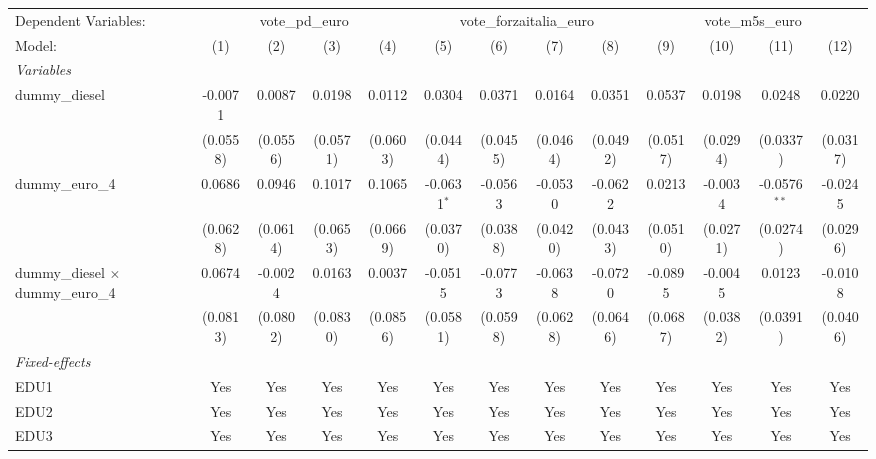 
\begingroup
\centering
\begin{tabular}{lcccccccccccc}
   \tabularnewline \midrule \midrule
   Dependent Variables: & \multicolumn{4}{c}{vote\_pd\_euro} & \multicolumn{4}{c}{vote\_forzaitalia\_euro} & \multicolumn{4}{c}{vote\_m5s\_euro}\\
   Model:                                    & (1)      & (2)      & (3)      & (4)      & (5)           & (6)      & (7)      & (8)      & (9)      & (10)     & (11)           & (12)\\  
   \midrule
   \emph{Variables}\\
   dummy\_diesel                             & -0.0071  & 0.0087   & 0.0198   & 0.0112   & 0.0304        & 0.0371   & 0.0164   & 0.0351   & 0.0537   & 0.0198   & 0.0248         & 0.0220\\   
                                             & (0.0558) & (0.0556) & (0.0571) & (0.0603) & (0.0444)      & (0.0455) & (0.0464) & (0.0492) & (0.0517) & (0.0294) & (0.0337)       & (0.0317)\\   
   dummy\_euro\_4                            & 0.0686   & 0.0946   & 0.1017   & 0.1065   & -0.0631$^{*}$ & -0.0563  & -0.0530  & -0.0622  & 0.0213   & -0.0034  & -0.0576$^{**}$ & -0.0245\\   
                                             & (0.0628) & (0.0614) & (0.0653) & (0.0669) & (0.0370)      & (0.0388) & (0.0420) & (0.0433) & (0.0510) & (0.0271) & (0.0274)       & (0.0296)\\   
   dummy\_diesel $\times$ dummy\_euro\_4     & 0.0674   & -0.0024  & 0.0163   & 0.0037   & -0.0515       & -0.0773  & -0.0638  & -0.0720  & -0.0895  & -0.0045  & 0.0123         & -0.0108\\   
                                             & (0.0813) & (0.0802) & (0.0830) & (0.0856) & (0.0581)      & (0.0598) & (0.0628) & (0.0646) & (0.0687) & (0.0382) & (0.0391)       & (0.0406)\\   
   \midrule
   \emph{Fixed-effects}\\
   EDU1                                      & Yes      & Yes      & Yes      & Yes      & Yes           & Yes      & Yes      & Yes      & Yes      & Yes      & Yes            & Yes\\  
   EDU2                                      & Yes      & Yes      & Yes      & Yes      & Yes           & Yes      & Yes      & Yes      & Yes      & Yes      & Yes            & Yes\\  
   EDU3                                      & Yes      & Yes      & Yes      & Yes      & Yes           & Yes      & Yes      & Yes      & Yes      & Yes      & Yes            & Yes\\  

\end{tabular}

